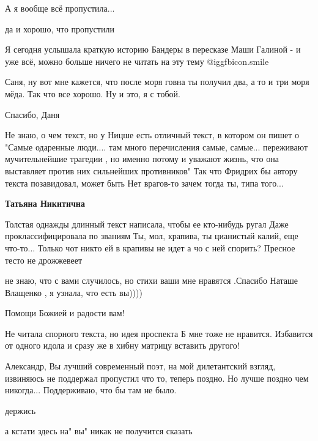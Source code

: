\begin{itemize}
А я вообще всё пропустила...

\begin{itemize} %
да и хорошо, что пропустили


Я сегодня услышала краткую историю Бандеры в пересказе Маши Галиной - и уже
всё, можно больше ничего не читать на эту тему  @igg{fbicon.smile} 
\end{itemize} %


Саня, ну вот мне кажется, что после моря говна ты получил два, а то и три моря
мёда. Так что все хорошо. Ну и это, я с тобой.

Спасибо, Даня


Не знаю, о чем текст, но у Ницше есть отличный текст, в котором он пишет о
"Самые одаренные люди.... там много перечисления самые, самые... переживают
мучительнейшие трагедии , но именно потому и уважают жизнь, что она выставляет
против них сильнейших противников" Так что Фридрих бы автору текста
позавидовал, может быть Нет врагов-то зачем тогда ты, типа того...

\textbf{Татьяна Никитична} 

Толстая однажды длинный текст написала, чтобы ее кто-нибудь ругал Даже
проклассифицировала по званиям Ты, мол, крапива, ты цианистый калий, еще
что-то... Только чот никто ей в крапивы не идет а чо с ней спорить? Пресное
тесто не дрожжевеет


не знаю, что с вами случилось, но стихи ваши мне нравятся .Спасибо Наташе Влащенко , я узнала, что есть вы))))

Помощи Божией и радости вам!


Не читала спорного текста, но идея проспекта Б мне тоже не нравится. Избавится
от одного идола и сразу же в хибну матрицу вставить другого!


Александр, Вы лучший современный поэт, на мой дилетантский взгляд, извиняюсь
не поддержал пропустил что то, теперь поздно. Но лучше поздно чем никогда...
Поддерживаю, что бы там не было.

держись

а кстати здесь на" вы" никак не получится сказать


\end{itemize} %
